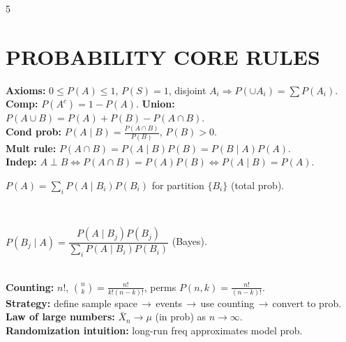 \documentclass[10pt,landscape,letterpaper]{article}
\newcommand{\concept}[1]{\textcolor{conceptcyan}{\textbf{#1}}}
\newcommand{\process}[1]{\textcolor{processpurple}{\textbf{#1}}}
\newcommand{\category}[1]{\textcolor{categorygreen}{\textbf{#1}}}
\newcommand{\important}[1]{{\setlength{\fboxsep}{1pt}\colorbox{highlightyellow}{\parbox{\dimexpr\linewidth-2\fboxsep\relax}{#1}}}}
\begin{document}
\begin{multicols}{5}
\section{PROBABILITY CORE RULES}
\concept{Axioms:} $0\le P(A)\le1$, $P(S)=1$, disjoint $A_i\Rightarrow P(\cup A_i)=\sum P(A_i)$.\\
\concept{Comp:} $P(A^c)=1-P(A)$. \concept{Union:} $P(A\cup B)=P(A)+P(B)-P(A\cap B)$.\\
\concept{Cond prob:} $P(A\mid B)=\frac{P(A\cap B)}{P(B)}$, $P(B)>0$.\\
\concept{Mult rule:} $P(A\cap B)=P(A\mid B)P(B)=P(B\mid A)P(A)$.\\
\concept{Indep:} $A\perp B\iff P(A\cap B)=P(A)P(B)\iff P(A\mid B)=P(A)$.\\
\important{$P(A)=\sum_i P(A\mid B_i)P(B_i)$ for partition $\{B_i\}$ (total prob).}\\
\important{$P(B_j\mid A)=\dfrac{P(A\mid B_j)P(B_j)}{\sum_i P(A\mid B_i)P(B_i)}$ (Bayes).}\\
\category{Counting:} $n!$, ${n\choose k}=\frac{n!}{k!(n-k)!}$, perms $P(n,k)=\frac{n!}{(n-k)!}$.\\
\process{Strategy:} define sample space\,$\to$\,events\,$\to$\,use counting\,$\to$\,convert to prob.\\
\concept{Law of large numbers:} $\bar X_n\to\mu$ (in prob) as $n\to\infty$.\\
\concept{Randomization intuition:} long-run freq approximates model prob.\\

\end{multicols}
\end{document}
